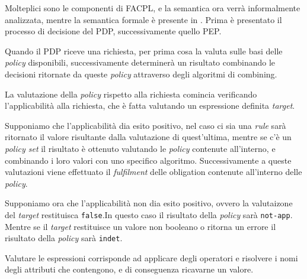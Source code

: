 Molteplici sono le componenti di FACPL, e la semantica ora verrà informalmente analizzata, mentre la semantica formale è presente in \cite{fullfacpl}.
Prima è presentato il processo di decisione del \ac{PDP}, successivamente quello \ac{PEP}. \par
Quando il PDP riceve una richiesta, per prima cosa la valuta sulle basi delle \textit{policy} disponibili, successivamente determinerà un risultato combinando le decisioni ritornate da queste \textit{policy} attraverso degli algoritmi di combining. \par
La valutazione della \textit{policy} rispetto alla richiesta comincia verificando l'applicabilità alla richiesta, che è fatta valutando un espressione definita \textit{target}. \par
Supponiamo che l'applicabilità dia esito positivo, nel caso ci sia una \textit{rule} sarà ritornato il valore risultante dalla valutazione di quest'ultima, mentre se c'è un \textit{policy set} il risultato è ottenuto valutando le \textit{policy} contenute all'interno, e combinando i loro valori con uno specifico algoritmo. Successivamente a queste valutazioni viene effettuato il \textit{fulfilment} delle obligation contenute all'interno delle \textit{policy}. \par
Supponiamo ora che l'applicabilità non dia esito positivo, ovvero la valutaizone del \textit{target} restituisca \texttt{false}.In questo caso il risultato della \textit{policy} sarà \texttt{not-app}. Mentre se il \textit{target} restituisce un valore non booleano o ritorna un errore il risultato della \textit{policy} sarà \texttt{indet}.

Valutare le espressioni corrisponde ad applicare degli operatori e risolvere i nomi degli attributi che contengono, e di conseguenza ricavarne un valore. \par

